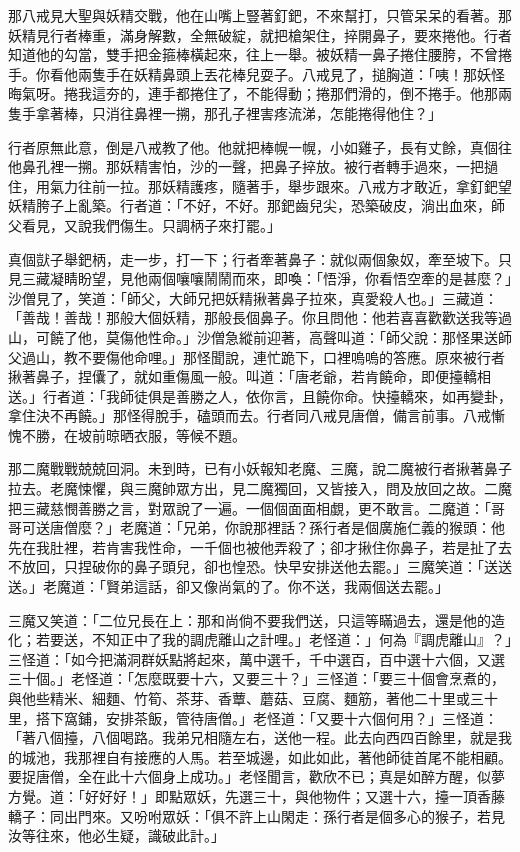 那八戒見大聖與妖精交戰，他在山嘴上豎著釘鈀，不來幫打，只管呆呆的看著。那妖精見行者棒重，滿身解數，全無破綻，就把槍架住，捽開鼻子，要來捲他。行者知道他的勾當，雙手把金箍棒橫起來，往上一舉。被妖精一鼻子捲住腰胯，不曾捲手。你看他兩隻手在妖精鼻頭上丟花棒兒耍子。八戒見了，搥胸道：「咦！那妖怪晦氣呀。捲我這夯的，連手都捲住了，不能得動；捲那們滑的，倒不捲手。他那兩隻手拿著棒，只消往鼻裡一搠，那孔子裡害疼流涕，怎能捲得他住？」

行者原無此意，倒是八戒教了他。他就把棒幌一幌，小如雞子，長有丈餘，真個往他鼻孔裡一搠。那妖精害怕，沙的一聲，把鼻子捽放。被行者轉手過來，一把撾住，用氣力往前一拉。那妖精護疼，隨著手，舉步跟來。八戒方才敢近，拿釘鈀望妖精胯子上亂築。行者道：「不好，不好。那鈀齒兒尖，恐築破皮，淌出血來，師父看見，又說我們傷生。只調柄子來打罷。」

真個獃子舉鈀柄，走一步，打一下；行者牽著鼻子：就似兩個象奴，牽至坡下。只見三藏凝睛盼望，見他兩個嚷嚷鬧鬧而來，即喚：「悟淨，你看悟空牽的是甚麼？」沙僧見了，笑道：「師父，大師兄把妖精揪著鼻子拉來，真愛殺人也。」三藏道：「善哉！善哉！那般大個妖精，那般長個鼻子。你且問他：他若喜喜歡歡送我等過山，可饒了他，莫傷他性命。」沙僧急縱前迎著，高聲叫道：「師父說：那怪果送師父過山，教不要傷他命哩。」那怪聞說，連忙跪下，口裡嗚嗚的答應。原來被行者揪著鼻子，捏儾了，就如重傷風一般。叫道：「唐老爺，若肯饒命，即便擡轎相送。」行者道：「我師徒俱是善勝之人，依你言，且饒你命。快擡轎來，如再變卦，拿住決不再饒。」那怪得脫手，磕頭而去。行者同八戒見唐僧，備言前事。八戒慚愧不勝，在坡前晾晒衣服，等候不題。

那二魔戰戰兢兢回洞。未到時，已有小妖報知老魔、三魔，說二魔被行者揪著鼻子拉去。老魔悚懼，與三魔帥眾方出，見二魔獨回，又皆接入，問及放回之故。二魔把三藏慈憫善勝之言，對眾說了一遍。一個個面面相覷，更不敢言。二魔道：「哥哥可送唐僧麼？」老魔道：「兄弟，你說那裡話？孫行者是個廣施仁義的猴頭：他先在我肚裡，若肯害我性命，一千個也被他弄殺了；卻才揪住你鼻子，若是扯了去不放回，只捏破你的鼻子頭兒，卻也惶恐。快早安排送他去罷。」三魔笑道：「送送送。」老魔道：「賢弟這話，卻又像尚氣的了。你不送，我兩個送去罷。」

三魔又笑道：「二位兄長在上：那和尚倘不要我們送，只這等瞞過去，還是他的造化；若要送，不知正中了我的調虎離山之計哩。」老怪道：」何為『調虎離山』？」三怪道：「如今把滿洞群妖點將起來，萬中選千，千中選百，百中選十六個，又選三十個。」老怪道：「怎麼既要十六，又要三十？」三怪道：「要三十個會烹煮的，與他些精米、細麵、竹筍、茶芽、香蕈、蘑菇、豆腐、麵筋，著他二十里或三十里，搭下窩鋪，安排茶飯，管待唐僧。」老怪道：「又要十六個何用？」三怪道：「著八個擡，八個喝路。我弟兄相隨左右，送他一程。此去向西四百餘里，就是我的城池，我那裡自有接應的人馬。若至城邊，如此如此，著他師徒首尾不能相顧。要捉唐僧，全在此十六個身上成功。」老怪聞言，歡欣不已；真是如醉方醒，似夢方覺。道：「好好好！」即點眾妖，先選三十，與他物件；又選十六，擡一頂香藤轎子：同出門來。又吩咐眾妖：「俱不許上山閑走：孫行者是個多心的猴子，若見汝等往來，他必生疑，識破此計。」

